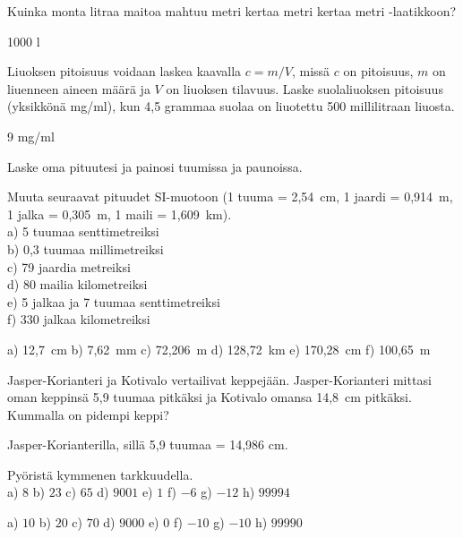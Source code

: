 \begin{tehtavasivu}
\begin{tehtava}
Kuinka monta litraa maitoa mahtuu metri kertaa metri kertaa metri -laatikkoon?
	\begin{vastaus}
	1000 l
	\end{vastaus}
\end{tehtava}

\begin{tehtava}
Liuoksen pitoisuus voidaan laskea kaavalla $c=m/V$, missä $c$ on pitoisuus, $m$ on liuenneen aineen määrä ja $V$ on liuoksen tilavuus.
Laske suolaliuoksen pitoisuus (yksikkönä mg/ml), kun 4,5 grammaa suolaa on liuotettu 500 millilitraan liuosta.
\begin{vastaus}
9 mg/ml
\end{vastaus}
\end{tehtava}

\begin{tehtava}
Laske oma pituutesi ja painosi tuumissa ja paunoissa.
\end{tehtava}

\begin{tehtava}
Muuta seuraavat pituudet SI-muotoon (1 tuuma = 2,54~cm, 1 jaardi = 0,914~m, 1 jalka = 0,305~m, 1 maili = 1,609~km). \\
a) 5 tuumaa senttimetreiksi \\
b) 0,3 tuumaa millimetreiksi \\
c) 79 jaardia metreiksi \\
d) 80 mailia kilometreiksi \\
e) 5 jalkaa ja 7 tuumaa senttimetreiksi \\
f) 330 jalkaa kilometreiksi
\begin{vastaus}
a) 12,7~cm \qquad
b) 7,62~mm \qquad
c) 72,206~m \qquad
d) 128,72~km \qquad
e) 170,28~cm \qquad
f) 100,65~m
\end{vastaus}
\end{tehtava}

\begin{tehtava}
Jasper-Korianteri ja Kotivalo vertailivat keppejään. Jasper-Korianteri mittasi oman keppinsä 5,9 tuumaa pitkäksi ja Kotivalo omansa 14,8~cm pitkäksi. Kummalla on pidempi keppi?
\begin{vastaus}
Jasper-Korianterilla, sillä 5,9 tuumaa = 14,986 cm.
\end{vastaus}
\end{tehtava}

\begin{tehtava}
Pyöristä kymmenen tarkkuudella. \\
a) $8$ \qquad
b) $23$ \qquad
c) $65$ \qquad
d) $9001$ \qquad
e) $1$ \qquad
f) $-6$ \qquad
g) $-12$ \qquad
h) $99994$
\begin{vastaus}
a) $10$ \qquad
b) $20$ \qquad
c) $70$ \qquad
d) $9000$ \qquad
e) $0$ \qquad
f) $-10$ \qquad
g) $-10$ \qquad
h) $99990$
\end{vastaus}
\end{tehtava}


\end{tehtavasivu}
